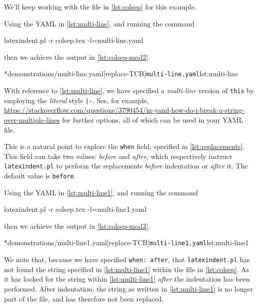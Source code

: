\begin{example}
  We'll keep working with the file in \vref{lst:colsep} for this example. 

        Using the YAML in \cref{lst:multi-line}, and running the command
\begin{commandshell}
latexindent.pl -r colsep.tex -l=multi-line.yaml
\end{commandshell}
then we achieve the output in \cref{lst:colsep-mod2}.
        \begin{cmhtcbraster}[raster column skip=.01\linewidth]
		\cmhlistingsfromfile*[style=yaml-LST]*{demonstrations/multi-line.yaml}[replace-TCB]{\texttt{multi-line.yaml}}{lst:multi-line}
        \end{cmhtcbraster}
  With reference to \cref{lst:multi-line}, we have specified a \emph{multi-line} version of \texttt{this} by employing the \emph{literal} 
  style \lstinline!|-!. See, for example, \href{https://stackoverflow.com/questions/3790454/in-yaml-how-do-i-break-a-string-over-multiple-lines}{https://stackoverflow.com/questions/3790454/in-yaml-how-do-i-break-a-string-over-multiple-lines}
  for further options, all of which can be used in your YAML file.

  This is a natural point to explore the \texttt{when} field, specified in \vref{lst:replacements}. This field can take two values: \emph{before}
  and \emph{after}, which respectively instruct \texttt{latexindent.pl} to perform the replacements \emph{before} indentation or \emph{after} it.
  The default value is \texttt{before}.

        Using the YAML in \cref{lst:multi-line1}, and running the command
\begin{commandshell}
latexindent.pl -r colsep.tex -l=multi-line1.yaml
\end{commandshell}
then we achieve the output in \cref{lst:colsep-mod3}.
        \begin{cmhtcbraster}[raster column skip=.01\linewidth]
		\cmhlistingsfromfile*[style=yaml-LST]*{demonstrations/multi-line1.yaml}[replace-TCB]{\texttt{multi-line1.yaml}}{lst:multi-line1}
        \end{cmhtcbraster}
        We note that, because we have specified \texttt{when: after}, that \texttt{latexindent.pl} has not found the string specified
        in \cref{lst:multi-line1} within the file in \vref{lst:colsep}. As it has looked for the string within \cref{lst:multi-line1} \emph{after} the indentation has been performed. After
        indentation, the string as written in \cref{lst:multi-line1} is no longer part of the file, and has therefore not been replaced.

\end{example}
